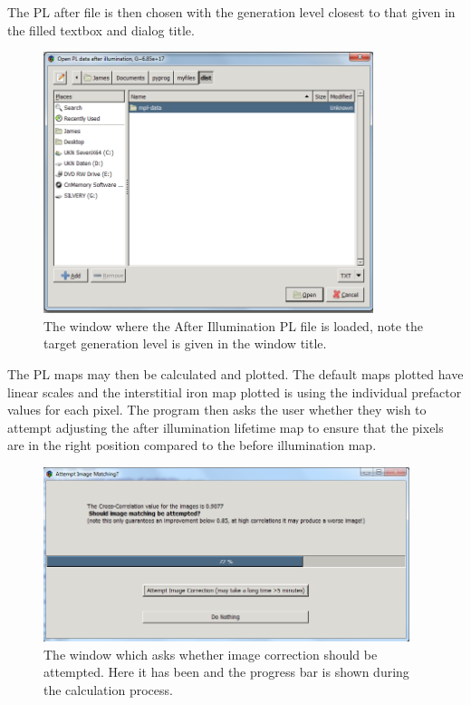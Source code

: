 \documentclass[final,a4paper,oneside,12pt]{article}
\begin{document}
The PL after file is then chosen with the generation level closest to that given in the filled textbox and dialog title.

\begin{figure}[h!]
\includegraphics[height=3in]{2loadplafterfile} 
\caption{\label{figure2} The window where the After Illumination PL file is loaded, note the target generation level is given in the window title.}
\end{figure}


 The PL maps may then be calculated and plotted. The default maps plotted have linear scales and the interstitial iron map plotted is using the individual prefactor values for each pixel. The program then asks the user whether they wish to attempt adjusting the after illumination lifetime map to ensure that the pixels are in the right position compared to the before illumination map.\\

\begin{figure}[h!]
\includegraphics[height=2in]{2attemptcorrection}
\caption{\label{figure2} The window which asks whether image correction should be attempted. Here it has been and the progress bar is shown during the calculation process.}
\end{figure}
\end{document}
